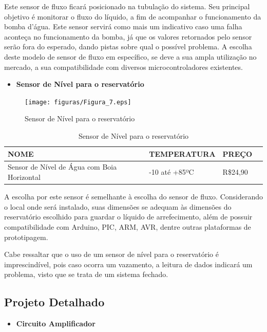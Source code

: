 Este sensor de fluxo ficará posicionado na tubulação do sistema. Seu principal objetivo é monitorar o fluxo do líquido, a fim de acompanhar o funcionamento da bomba d’água. Este sensor servirá como mais um indicativo caso uma falha aconteça no funcionamento da bomba, já que os valores retornados pelo sensor serão fora do esperado, dando pistas sobre qual o possível problema. A escolha deste modelo de sensor de fluxo em específico, se deve a sua ampla utilização no mercado, a sua compatibilidade com diversos microcontroladores existentes.
\newpage
\begin{itemize}
    \item \textbf{Sensor de Nível para o reservatório}
\end{itemize}
\begin{figure}[!h]                  
	\centering                          
	\texttt{[image: figuras/Figura\_7.eps]}
	\caption{ Sensor de Nível para o reservatório}             
\end{figure}

\begin{table}[!h]
    \centering
    \begin{tabular}{|p{3cm}|p{5cm}|p{3cm}|p{3cm}|}
    \hline
    \textbf{NOME} & \textbf{TEMPERATURA}    & \textbf{PREÇO} \\ \hline
    Sensor de Nível de Água com Boia Horizontal      & -10 até +85ºC &  R\$24,90  \\ \hline
    \end{tabular}
    \caption{Sensor de Nível para o reservatório}
    \end{table}

A escolha por este sensor é semelhante à escolha do sensor de fluxo. Considerando o local onde será instalado, suas dimensões se adequam às dimensões do reservatório escolhido para guardar o líquido de arrefecimento, além de possuir compatibilidade com Arduino, PIC, ARM, AVR, dentre outras plataformas de prototipagem.

Cabe ressaltar que o uso de um sensor de nível para o reservatório é imprescindível, pois caso ocorra um vazamento, a leitura de dados indicará um problema, visto que se trata de um sistema fechado.

\subsection{Projeto Detalhado}

\begin{itemize}
    \item \textbf{Circuito Amplificador}
\end{itemize}

